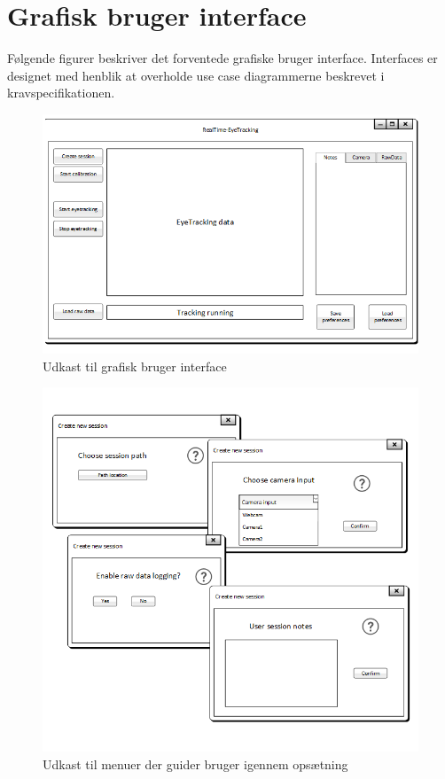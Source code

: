 \documentclass[softwarearkitektur.tex]{subfiles}
\begin{document}
\section{Grafisk bruger interface}
Følgende figurer beskriver det forventede grafiske bruger interface. Interfaces er designet med henblik at overholde use case diagrammerne beskrevet i kravspecifikationen.

\begin{figure}
\centering
\includegraphics[width=0.7\linewidth]{GUIudkast}
\caption{Udkast til grafisk bruger interface}
\label{fig:GUIudkast}
\end{figure}

\begin{figure}
	\centering
	\includegraphics[width=0.7\linewidth]{Undermenuer}
	\caption{Udkast til menuer der guider bruger igennem opsætning}
	\label{fig:Undermenuer}
\end{figure}
\end{document}
